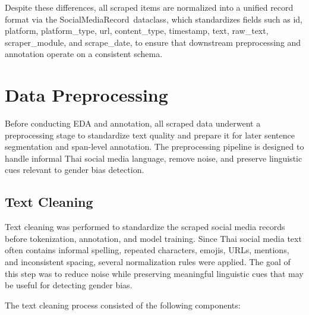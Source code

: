 \documentclass[12pt,oneside,openright,a4paper]{cpe-english-project}
\begin{document}
Despite these differences, all scraped items are normalized into a unified record format via the SocialMediaRecord~dataclass, which standardizes fields such as id, platform, platform\_type, url, content\_type, timestamp, text, raw\_text, scraper\_module, and scrape\_date, to ensure that downstream preprocessing and annotation operate on a consistent schema.

\section{Data Preprocessing}

Before conducting EDA and annotation, all scraped data underwent a preprocessing stage to standardize text quality and prepare it for later sentence segmentation and span-level annotation. The preprocessing pipeline is designed to handle informal Thai social media language, remove noise, and preserve linguistic cues relevant to gender bias detection.

\subsection{Text Cleaning}

Text cleaning was performed to standardize the scraped social media records before tokenization, annotation, and model training. Since Thai social media text often contains informal spelling, repeated characters, emojis, URLs, mentions, and inconsistent spacing, several normalization rules were applied. The goal of this step was to reduce noise while preserving meaningful linguistic cues that may be useful for detecting gender bias.

The text cleaning process consisted of the following components:
\end{document}
